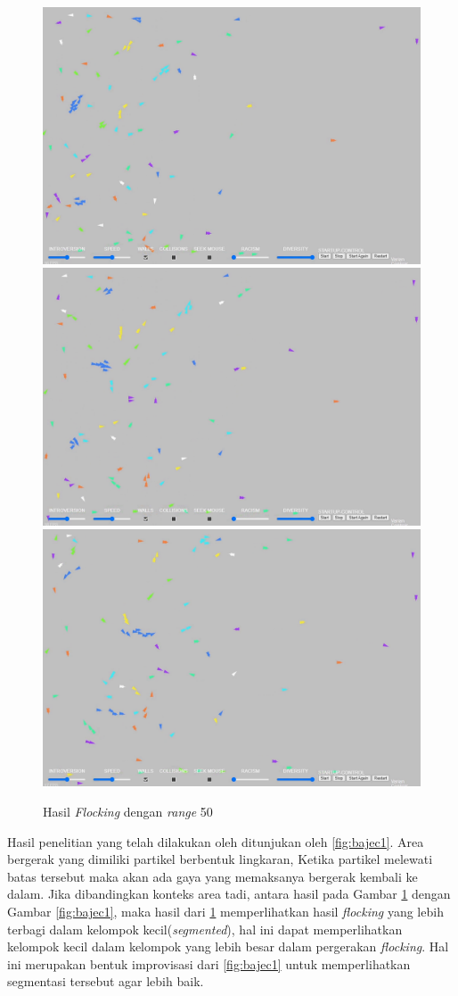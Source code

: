 \begin{figure}
    \\[\smallskipamount]
    \includegraphics[width=.32\textwidth]{gambar/sequenceperbandingan/00600.png}\hfill
    \includegraphics[width=.32\textwidth]{gambar/sequenceperbandingan/00700.png}\hfill
    \includegraphics[width=.32\textwidth]{gambar/sequenceperbandingan/00800.png}

    \caption{Hasil \textit{Flocking} dengan \textit{range} 50}\label{fig:sequenceperbandingan}
\end{figure}

\hspace{0.6cm}Hasil penelitian yang telah dilakukan oleh \citep{Bajec2007} ditunjukan oleh \ref{fig:bajec1}. Area bergerak yang dimiliki partikel berbentuk lingkaran, Ketika partikel melewati batas tersebut maka akan ada gaya yang memaksanya bergerak kembali ke dalam. Jika dibandingkan konteks area tadi, antara hasil pada Gambar \ref{fig:sequenceperbandingan} dengan Gambar \ref{fig:bajec1}, maka hasil dari \ref{fig:sequenceperbandingan} memperlihatkan hasil \textit{flocking} yang lebih terbagi dalam kelompok kecil(\textit{segmented}), hal ini dapat memperlihatkan kelompok kecil dalam kelompok yang lebih besar dalam pergerakan \textit{flocking}. Hal ini merupakan bentuk improvisasi dari \ref{fig:bajec1} untuk memperlihatkan segmentasi tersebut agar lebih baik.

